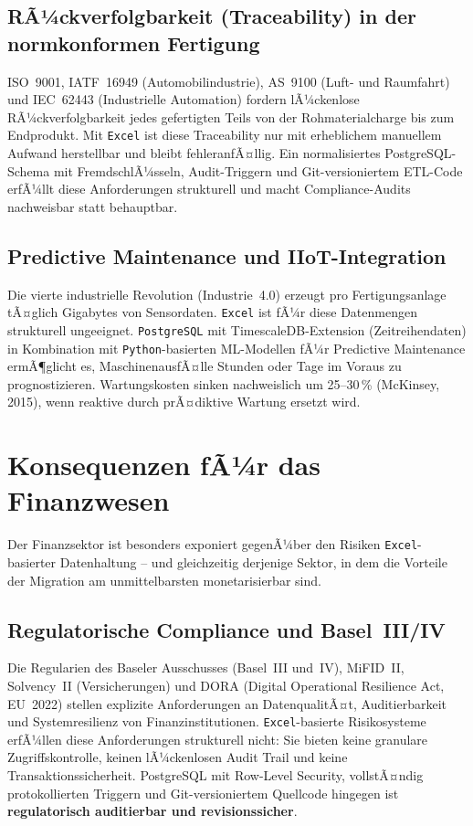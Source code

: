 ﻿\documentclass[12pt,a4paper]{report}
\theoremstyle{definition}
\theoremstyle{remark}
\newcommand{\excel}{\texttt{Excel}}
\newcommand{\pg}{\texttt{PostgreSQL}}
\newcommand{\py}{\texttt{Python}}
\begin{document}
\subsection{RÃ¼ckverfolgbarkeit (Traceability) in der normkonformen Fertigung}

ISO~9001, IATF~16949 (Automobilindustrie), AS~9100 (Luft- und
Raumfahrt) und IEC~62443 (Industrielle Automation) fordern
lÃ¼ckenlose RÃ¼ckverfolgbarkeit jedes gefertigten Teils von der
Rohmaterialcharge bis zum Endprodukt.
Mit \excel{} ist diese Traceability nur mit erheblichem manuellem
Aufwand herstellbar und bleibt fehleranfÃ¤llig.
Ein normalisiertes PostgreSQL-Schema mit FremdschlÃ¼sseln,
Audit-Triggern und Git-versioniertem ETL-Code erfÃ¼llt diese
Anforderungen strukturell und macht Compliance-Audits nachweisbar
statt behauptbar.

\subsection{Predictive Maintenance und IIoT-Integration}

Die vierte industrielle Revolution (Industrie~4.0) erzeugt pro
Fertigungsanlage tÃ¤glich Gigabytes von Sensordaten.
\excel{} ist fÃ¼r diese Datenmengen strukturell ungeeignet.
\pg{} mit TimescaleDB-Extension (Zeitreihendaten) in Kombination
mit \py-basierten ML-Modellen fÃ¼r Predictive Maintenance ermÃ¶glicht
es, MaschinenausfÃ¤lle Stunden oder Tage im Voraus zu prognostizieren.
Wartungskosten sinken nachweislich um 25--30\,\% (McKinsey, 2015),
wenn reaktive durch prÃ¤diktive Wartung ersetzt wird.

\section{Konsequenzen fÃ¼r das Finanzwesen}

Der Finanzsektor ist besonders exponiert gegenÃ¼ber den Risiken
\excel-basierter Datenhaltung -- und gleichzeitig derjenige Sektor,
in dem die Vorteile der Migration am unmittelbarsten monetarisierbar
sind.

\subsection{Regulatorische Compliance und Basel~III/IV}

Die Regularien des Baseler Ausschusses (Basel~III und~IV),
MiFID~II, Solvency~II (Versicherungen) und DORA
(Digital Operational Resilience Act, EU~2022) stellen explizite
Anforderungen an DatenqualitÃ¤t, Auditierbarkeit und Systemresilienz
von Finanzinstitutionen.
\excel-basierte Risikosysteme erfÃ¼llen diese Anforderungen strukturell
nicht: Sie bieten keine granulare Zugriffskontrolle, keinen
lÃ¼ckenlosen Audit Trail und keine Transaktionssicherheit.
PostgreSQL mit Row-Level Security, vollstÃ¤ndig protokollierten
Triggern und Git-versioniertem Quellcode hingegen ist
\textbf{regulatorisch auditierbar und revisionssicher}.
\end{document}
